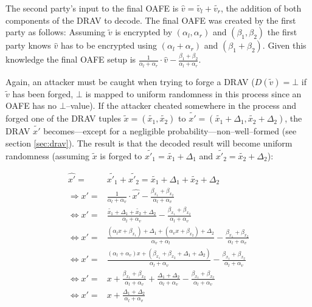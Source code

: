The second party's input to the final OAFE is $\widehat{v} = \widetilde{v_l} +
\widetilde{v_r}$, the addition of both components of the DRAV to decode.  The
final OAFE was created by the first party as follows: Assuming $\widetilde{v}$
is encrypted by $(\alpha_l, \alpha_r)$ and $(\beta_1, \beta_2)$ the first party
knows $\widehat{v}$ has to be encrypted using $(\alpha_l + \alpha_r)$ and
$(\beta_1 + \beta_2)$.  Given this knowledge the final OAFE setup is
$\frac{1}{\alpha_l + \alpha_r} \cdot \widehat{v} - \frac{\beta_1 +
\beta_2}{\alpha_l + \alpha_r}$.

Again, an attacker must be caught when trying to forge a DRAV ($D(\widetilde{v})
= \bot$ if $\widetilde{v}$ has been forged, $\bot$ is mapped to uniform
randomness in this process since an OAFE has no $\bot$--value). If the attacker
cheated somewhere in the process and forged one of the DRAV tuples
$\widetilde{x} = (\widetilde{x_1}, \widetilde{x_2})$ to $\widetilde{x'} =
(\widetilde{x_1} + \Delta_1, \widetilde{x_2} + \Delta_2)$, the DRAV
$\widetilde{x'}$ becomes---except for a negligible
probability---non--well--formed (see section \ref{sec:drav}). The result is that
the decoded result will become uniform randomness (assuming $\widetilde{x}$ is
forged to $\widetilde{x'_1} = \widetilde{x_1} + \Delta_1$ and $\widetilde{x'_2}
= \widetilde{x_2} + \Delta_2$):

\begin{align*}
  \widehat{x'} = & \widetilde{x'_1} + \widetilde{x'_2} = \widetilde{x_1} +
  \Delta_1 + \widetilde{x_2} + \Delta_2 \\
  \Rightarrow x' = & \frac{1}{\alpha_l + \alpha_v} \cdot \widehat{x'} -
  \frac{\beta_{x_1} +
  \beta_{x_2}}{\alpha_l + \alpha_v} \\
  \Leftrightarrow x' = & \frac{\widetilde{x_1} + \Delta_1 +
  \widetilde{x_2} + \Delta_2}{\alpha_l + \alpha_v} -
  \frac{\beta_{x_1} +\beta_{x_2}}{\alpha_l + \alpha_v}\\
  \Leftrightarrow x' = & \frac{(\alpha_l x + \beta_{x_1}) + \Delta_1 +
  (\alpha_v x + \beta_{x_2}) + \Delta_2}{\alpha_v + \alpha_l} -
  \frac{\beta_{x_1} +\beta_{x_2}}{\alpha_l + \alpha_v} \\
  \Leftrightarrow x' = & \frac{(\alpha_l+\alpha_v)x + (\beta_{x_1}+\beta_{x_2} +
  \Delta_1+\Delta_2)}{\alpha_l+\alpha_v} -
  \frac{\beta_{x_1} +\beta_{x_2}}{\alpha_l + \alpha_v} \\
  \Leftrightarrow x' = & x + \frac{\beta_{x_1}+\beta_{x_2}}{\alpha_l+\alpha_v}
  + \frac{\Delta_1 + \Delta_2}{\alpha_l + \alpha_v} -
  \frac{\beta_{x_1}+\beta_{x_2}}{\alpha_l + \alpha_v} \\
  \Leftrightarrow x' = & x + \frac{\Delta_1 + \Delta_2}{\alpha_l + \alpha_v}\\
\end{align*}

